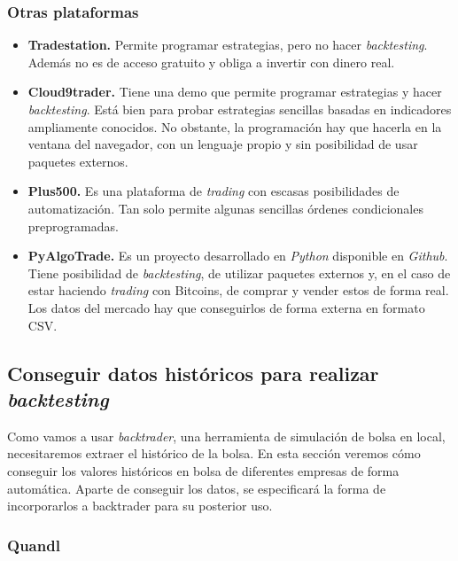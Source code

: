 		
		\subsubsection{Otras plataformas}

		\begin{itemize}
			\item \textbf{Tradestation.} Permite programar estrategias, pero no hacer \textit{backtesting}. Adem\'as no es de acceso gratuito y obliga a invertir con dinero real.
			
			\item \textbf{Cloud9trader.} Tiene una demo que permite programar estrategias y hacer \textit{backtesting}. Est\'a bien para probar estrategias sencillas basadas en indicadores ampliamente conocidos. No obstante, la programaci\'on hay que hacerla en la ventana del navegador, con un lenguaje propio y sin posibilidad de usar paquetes externos.
			
			\item \textbf{Plus500.} Es una plataforma de \textit{trading} con escasas posibilidades de automatizaci\'on. Tan solo permite algunas  sencillas \'ordenes condicionales preprogramadas.
			
			\item \textbf{PyAlgoTrade.} Es un proyecto desarrollado en \textit{Python} disponible en \textit{Github}. Tiene posibilidad de \textit{backtesting}, de utilizar paquetes externos y, en el caso de estar haciendo \textit{trading} con Bitcoins, de comprar y vender estos de forma real. Los datos del mercado hay que conseguirlos de forma externa en formato CSV.
		\end{itemize}
		
	
	\subsection{Conseguir datos hist\'oricos para realizar \textit{backtesting}}\label{sec:get_data}
		
		Como vamos a usar \textit{backtrader}, una herramienta de simulaci\'on de bolsa en local, necesitaremos extraer el hist\'orico de la bolsa. En esta secci\'on veremos c\'omo conseguir los valores hist\'oricos en bolsa de diferentes empresas de forma autom\'atica. Aparte de conseguir los datos, se especificar\'a la forma de incorporarlos a backtrader para su posterior uso.\\
		
		\subsubsection{Quandl}
		
